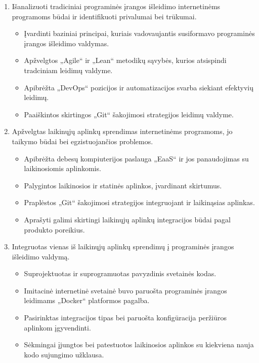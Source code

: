 \documentclass{VUMIFPSkursinis}
\begin{document}
\begin{enumerate}
  \item Išanalizuoti tradiciniai programinės įrangos išleidimo internetinėms programoms būdai ir identifikuoti privalumai bei trūkumai.
    \begin{itemize}
      \item Įvardinti baziniai principai, kuriais vadovaujantis susiformavo programinės įrangos išleidimo valdymas.
      \item Apžvelgtos „Agile“ ir „Lean“ metodikų sąvybės, kurios atsispindi tradciniam leidimų valdyme.
      \item Apibrėžta „DevOps“ pozicijos ir automatizacijos svarba siekiant efektyvių leidimų.
      \item Paaiškintos skirtingos „Git“ šakojimosi strategijos leidimų valdyme.
    \end{itemize}
  \item Apžvelgtas laikinųjų aplinkų sprendimas internetinėms programoms, jo taikymo būdai bei egzistuojančios problemos.
    \begin{itemize}
      \item Apibrėžta debesų kompiuterijos paslauga „EaaS“ ir jos panaudojimas su laikinosiomis aplinkomis.
      \item Palygintos laikinosios ir statinės aplinkos, įvardinant skirtumus.
      \item Praplėstos „Git“ šakojimosi strategijos integruojant ir laikinąsias aplinkas.
      \item Aprašyti galimi skirtingi laikinųjų aplinkų integracijos būdai pagal produkto poreikius.
    \end{itemize}
  \item Integruotas vienas iš laikinųjų aplinkų sprendimų į programinės įrangos išleidimo valdymą.
    \begin{itemize}
      \item Suprojektuotas ir suprogramuotas pavyzdinis svetainės kodas.
      \item Imitacinė internetinė svetainė buvo paruošta programinės įrangos leidimams „Docker“ platformos pagalba. 
      \item Pasirinktas integracijos tipas bei paruošta konfigūracija peržiūros aplinkom įgyvendinti.
      \item Sėkmingai įjungtos bei patestuotos laikinosios aplinkos su kiekviena nauja kodo sujungimo užklausa.
    \end{itemize}
\end{enumerate}
\end{document}
